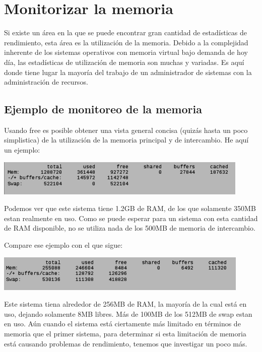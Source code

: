 \documentclass[12pt]{article}
\begin{document}
\section*{Monitorizar la memoria}
Si existe un área en la que se puede encontrar gran cantidad de estadísticas de rendimiento, esta área es la utilización de la memoria. Debido a la complejidad inherente de los sistemas operativos con memoria virtual bajo demanda de hoy día, las estadísticas de utilización de memoria son muchas y variadas. Es aquí donde tiene lugar la mayoría del trabajo de un administrador de sistemas con la administración de recursos.


\subsection*{Ejemplo de monitoreo de la memoria}


Usando free es posible obtener una vista general concisa (quizás hasta un poco simplistica) de la utilización de la memoria principal y de intercambio. He aquí un ejemplo:

\begin{center}
 \includegraphics{free1.png}
\end{center}

      
Podemos ver que este sistema tiene 1.2GB de RAM, de los que solamente 350MB estan realmente en uso. Como se puede esperar para un sistema con esta cantidad de RAM disponible, no se utiliza nada de los 500MB de memoria de intercambio.

Compare ese ejemplo con el que sigue:

\begin{center}
 \includegraphics{free2.png}
\end{center}

      
Este sistema tiena alrededor de 256MB de RAM, la mayoría de la cual está en uso, dejando solamente 8MB libres. Más de 100MB de los 512MB de swap estan en uso. Aún cuando el sistema está ciertamente más limitado en términos de memoria que el primer sistema, para determinar si esta limitación de memoria está causando problemas de rendimiento, tenemos que investigar un poco más.
\end{document}
